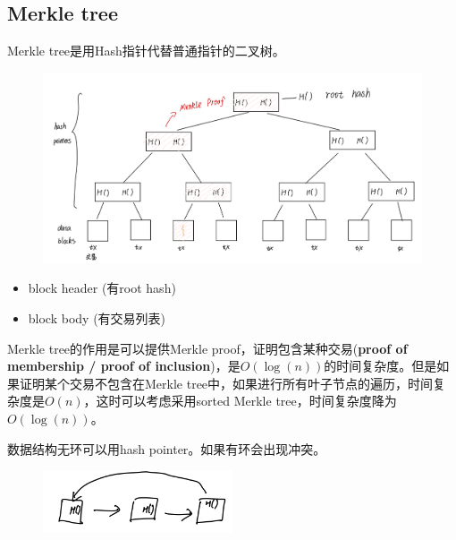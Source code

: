 \documentclass[10pt]{ctexart}
\begin{document}
\subsection{Merkle tree}
Merkle tree是用Hash指针代替普通指针的二叉树。
\begin{figure}[H]
    \centering
    \includegraphics[width=1\textwidth]{./lecture3/img3.png} 
\end{figure}
\begin{itemize}
    \item block header (有root hash)
    \item block body (有交易列表)
\end{itemize}
Merkle tree的作用是可以提供Merkle proof，证明包含某种交易(\textbf{proof of membership / proof of inclusion})，是$O(\log(n))$的时间复杂度。但是如果证明某个交易不包含在Merkle tree中，如果进行所有叶子节点的遍历，时间复杂度是$O(n)$，这时可以考虑采用sorted Merkle tree，时间复杂度降为$O(\log(n))$。
 
数据结构无环可以用hash pointer。如果有环会出现冲突。
\begin{figure}[H]
    \centering
    \includegraphics[width=0.5\textwidth]{./lecture3/img4.png} 
\end{figure}
\end{document}
